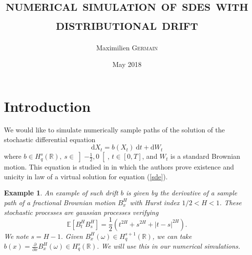 \documentclass{article}[12pt]
\newcommand{\pade}[2]{\frac{\partial #1}{\partial #2}}
\newtheorem{ex}{Example}[section]
\newcommand{\R}{\mathbb{R}}
\newcommand{\E}{\mathbb{E}}
\newcommand{\di}{\mathrm{d}}
\begin{document}
\title{\Large \textsc{\textbf{numerical simulation of sdes with distributional drift}}} \author{Maximilien \textsc{Germain} \date{May 2018}}
\maketitle

\section{Introduction}

    \paragraph{}
    We would like to simulate numerically sample paths of the solution of the stochastic differential equation
    \begin{equation} \label{sde}
    \di X_t = b(X_t)\ \di t + \di W_t
    \end{equation}
    where $b\in H^s_q(\R),\ s\in\left]-\frac{1}{2},0\right[$, $t\in[0,T]$, and $W_t$ is a standard Brownian motion. This equation is studied in \cite{Fla-Iss-Rus-2017} in which the authors prove existence and unicity in law of a virtual solution for equation (\ref{sde}). 
    
    \begin{ex}
        An example of such drift $b$ is given by the derivative of a sample path of a fractional Brownian motion $B^H_x$ with Hurst index $1/2<H<1$. These stochastic processes are gaussian processes verifying $$\E\left[B_t^HB_s^H\right]=\frac{1}{2}\left(t^{2H}+s^{2H}+|t-s|^{2H}\right).$$ We note $s = H - 1$. Given $B^H_x(\omega)\in H^{s+1}_q(\R)$, we can take $b(x) = \pade{}{x}B^H_x(\omega)\in H^s_q(\R)$. We will use this in our numerical simulations.
    \end{ex}    
    
\end{document}
